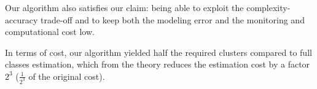 Our algorithm also satisfies our claim: being able to exploit the complexity-accuracy trade-off and to keep both the modeling error and the monitoring and computational cost low. 

In terms of cost, our algorithm yielded half the required clusters compared to full classes estimation, which from the theory reduces the estimation cost by a factor $2^3$ ($\frac{1}{2^3}$ of the original cost). 








